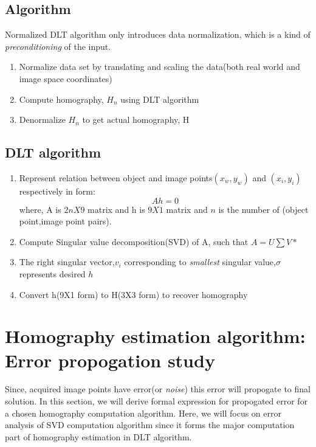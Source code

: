 \documentclass{article}
\begin{document}
\subsection{Algorithm}
Normalized DLT algorithm only introduces data normalization, which is a kind of \textit{preconditioning} of the input.
\begin{enumerate}
\item Normalize data set by translating and scaling the data(both real world and image space coordinates)
\item Compute homography, $H_n$ using DLT algorithm
\item Denormalize $H_n$ to get actual homography, H
\end{enumerate}

\subsection{DLT algorithm}
\begin{enumerate}
\item Represent relation between object and image points{$(x_w,y_w)$ and $(x_i,y_i)$ respectively} in form:
\begin{equation}
Ah=0
\end{equation}
where,\newline
A is $2nX9$ matrix and h is $9X1$ matrix and $n$ is the number of (object point,image point pairs).
\item Compute Singular value decomposition(SVD) of A, such that $A=U\sum V*$
\item The right singular vector,$v_i$ corresponding to \textit{smallest} singular value,$\sigma$ represents desired $h$
\item Convert h(9X1 form) to H(3X3 form) to recover homography 

\end{enumerate}


\section{Homography estimation algorithm: Error propogation study}
Since, acquired image points have error(or \textit{noise}) this error will propogate to final solution. In this section, we will derive formal expression for propogated error for a chosen homography computation algorithm. Here, we will focus on error analysis of SVD computation algorithm since it forms the major computation part of homography estimation in DLT algorithm.
\end{document}
